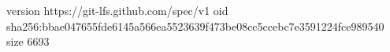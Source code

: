version https://git-lfs.github.com/spec/v1
oid sha256:bbae047655fde6145a566ea5523639f473be08cc5ccebc7e3591224fce989540
size 6693
